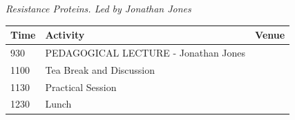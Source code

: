 \documentclass[12pt,]{book}
\theoremstyle{definition}
\theoremstyle{definition}
\theoremstyle{remark}
\begin{document}
\emph{Resistance Proteins. Led by Jonathan Jones}

\begin{longtable}[]{@{}lll@{}}
\toprule
\begin{minipage}[b]{0.09\columnwidth}\raggedright\strut
Time\strut
\end{minipage} & \begin{minipage}[b]{0.39\columnwidth}\raggedright\strut
Activity\strut
\end{minipage} & \begin{minipage}[b]{0.39\columnwidth}\raggedright\strut
Venue\strut
\end{minipage}\tabularnewline
\midrule
\endhead
\begin{minipage}[t]{0.09\columnwidth}\raggedright\strut
930\strut
\end{minipage} & \begin{minipage}[t]{0.39\columnwidth}\raggedright\strut
PEDAGOGICAL LECTURE - Jonathan Jones\strut
\end{minipage} & \begin{minipage}[t]{0.39\columnwidth}\raggedright\strut
\strut
\end{minipage}\tabularnewline
\begin{minipage}[t]{0.09\columnwidth}\raggedright\strut
1100\strut
\end{minipage} & \begin{minipage}[t]{0.39\columnwidth}\raggedright\strut
Tea Break and Discussion\strut
\end{minipage} & \begin{minipage}[t]{0.39\columnwidth}\raggedright\strut
\strut
\end{minipage}\tabularnewline
\begin{minipage}[t]{0.09\columnwidth}\raggedright\strut
1130\strut
\end{minipage} & \begin{minipage}[t]{0.39\columnwidth}\raggedright\strut
Practical Session\strut
\end{minipage} & \begin{minipage}[t]{0.39\columnwidth}\raggedright\strut
\strut
\end{minipage}\tabularnewline
\begin{minipage}[t]{0.09\columnwidth}\raggedright\strut
1230\strut
\end{minipage} & \begin{minipage}[t]{0.39\columnwidth}\raggedright\strut
Lunch\strut
\end{minipage} & \begin{minipage}[t]{0.39\columnwidth}\raggedright\strut

\end{minipage}
\end{longtable}
\end{document}
